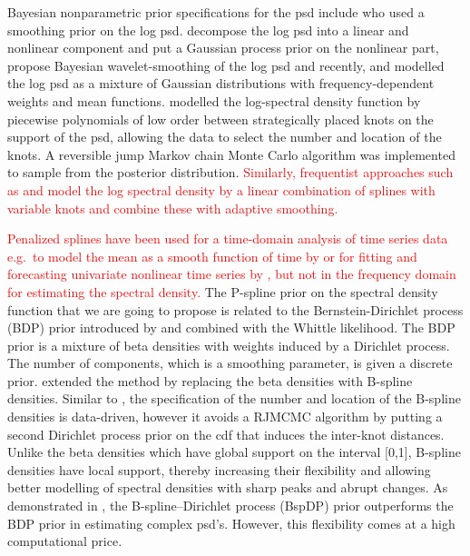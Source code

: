 \documentclass[twocolumn,final]{svjour3}
\begin{document}
Bayesian nonparametric prior specifications for the psd include \cite{Cart:1997}
who used a smoothing prior on the log psd.  \cite{Rosen:2012} decompose the log psd into a linear and nonlinear component and  put a Gaussian process prior on the nonlinear part, \cite{Pensky:2007} propose Bayesian wavelet-smoothing of the log psd and recently, and \cite{Cadonna2017} modelled the log psd  as a mixture of Gaussian distributions with frequency-dependent weights and mean functions.
%
\cite{Gangopadhyay:1999} modelled the log-spectral density function by  piecewise polynomials of low order between strategically placed knots on the support of the psd,  allowing the data to select the number and location of the knots.  A reversible jump Markov chain Monte Carlo \citep[RJMCMC;][]{Green:1995} algorithm was implemented to sample from the posterior distribution. \textcolor{red}{Similarly, frequentist approaches such as \cite{Rodriguez} and \cite{Wood2017} model the log spectral density by a linear
combination of splines with variable knots and combine these with adaptive smoothing. }

\textcolor{red}{Penalized splines have been used for a time-domain analysis of time series data e.g.\ to model the mean as a smooth function of time by
\cite{Krivobokova}  or for fitting and  forecasting univariate  nonlinear time series by \cite{Wegener}, but not in the frequency domain for estimating the spectral density.}
The P-spline prior on the spectral density function that we are going to propose is related to the 
Bernstein-Dirichlet process (BDP) prior  introduced by \cite{Choudhuri:2004} and combined with the Whittle likelihood.  The BDP prior  is a mixture of beta densities with weights induced by a Dirichlet process.  The number of components, which is a smoothing parameter, is given a discrete prior.  \cite{Edwards2019} extended the method by replacing the beta densities with B-spline densities. Similar to 
\cite{Gangopadhyay:1999}, the specification of the number and location of the B-spline densities is data-driven, however it avoids a RJMCMC algorithm by putting a second Dirichlet process prior  on the cdf that induces the inter-knot distances. 
Unlike the beta densities  which have global support on the interval [0,1], B-spline densities have local support, thereby increasing their flexibility and allowing better modelling of spectral densities with sharp peaks and abrupt changes.  As demonstrated in \cite{Edwards2019}, the B-spline--Dirichlet process (BspDP) prior outperforms the BDP prior in estimating complex psd's.  However, this flexibility comes at a high computational price.
\end{document}

